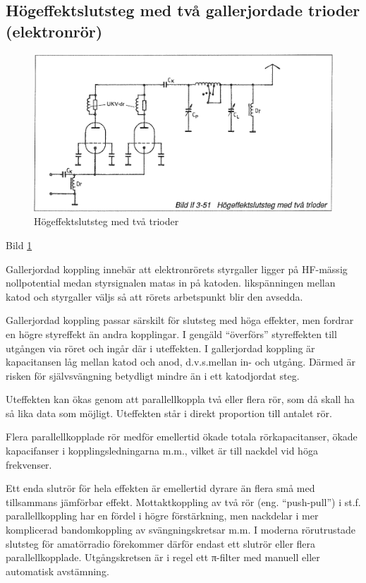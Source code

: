 \begin{rev-raderas}
\subsection{Högeffektslutsteg med två gallerjordade trioder (elektronrör)}

\begin{figure}
\includegraphics[width=\textwidth]{images/bild_2_3-51}
\caption{Högeffektslutsteg med två trioder}
\label{fig:BildII3-51}
\end{figure}

Bild \ref{fig:BildII3-51}

Gallerjordad koppling innebär att elektronrörets styrgaller ligger på
HF-mässig nollpotential medan styrsignalen matas in på
katoden. likspänningen mellan katod och styrgaller väljs så att rörets
arbetspunkt blir den avsedda.

Gallerjordad koppling passar särskilt för slutsteg med höga effekter,
men fordrar en högre styreffekt än andra kopplingar. I gengäld
``överförs'' styreffekten till utgången via röret och ingår där i
uteffekten. I gallerjordad koppling är kapacitansen låg mellan katod
och anod, d.v.s.mellan in- och utgång. Därmed är risken för
självsvängning betydligt mindre än i ett katodjordat steg.

Uteffekten kan ökas genom att parallellkoppla två eller flera rör, som
då skall ha så lika data som möjligt. Uteffekten står i direkt
proportion till antalet rör.

Flera parallellkopplade rör medför emellertid ökade totala
rörkapacitanser, ökade kapacifanser i kopplingsledningarna m.m.,
vilket är till nackdel vid höga frekvenser.

Ett enda slutrör för hela effekten är emellertid dyrare än flera små
med tillsammans jämförbar effekt. Mottaktkoppling av två rör
(eng. ``push-pull'') i st.f. parallellkoppling har en fördel i högre
förstärkning, men nackdelar i mer komplicerad bandomkoppling av
svängningskretsar m.m. I moderna rörutrustade slutsteg för amatörradio
förekommer därför endast ett slutrör eller flera
parallellkopplade. Utgångskretsen är i regel ett π-filter med manuell
eller automatisk avstämning.
\end{rev-raderas}

